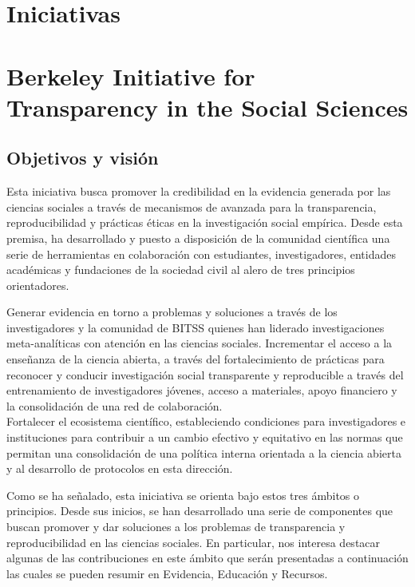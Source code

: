 \documentclass[
]{book}
\begin{document}
\hypertarget{iniciativas}{%
\section{Iniciativas}\label{iniciativas}}

\hypertarget{berkeley-initiative-for-transparency-in-the-social-sciences}{%
\section{Berkeley Initiative for Transparency in the Social Sciences}\label{berkeley-initiative-for-transparency-in-the-social-sciences}}

\hypertarget{objetivos-y-visiuxf3n}{%
\subsection{Objetivos y visión}\label{objetivos-y-visiuxf3n}}

Esta iniciativa busca promover la credibilidad en la evidencia generada por las ciencias sociales a través de mecanismos de avanzada para la transparencia, reproducibilidad y prácticas éticas en la investigación social empírica. Desde esta premisa, ha desarrollado y puesto a disposición de la comunidad científica una serie de herramientas en colaboración con estudiantes, investigadores, entidades académicas y fundaciones de la sociedad civil al alero de tres principios orientadores.

Generar evidencia en torno a problemas y soluciones a través de los investigadores y la comunidad de BITSS quienes han liderado investigaciones meta-analíticas con atención en las ciencias sociales.
Incrementar el acceso a la enseñanza de la ciencia abierta, a través del fortalecimiento de prácticas para reconocer y conducir investigación social transparente y reproducible a través del entrenamiento de investigadores jóvenes, acceso a materiales, apoyo financiero y la consolidación de una red de colaboración.\\
Fortalecer el ecosistema científico, estableciendo condiciones para investigadores e instituciones para contribuir a un cambio efectivo y equitativo en las normas que permitan una consolidación de una política interna orientada a la ciencia abierta y al desarrollo de protocolos en esta dirección.

Como se ha señalado, esta iniciativa se orienta bajo estos tres ámbitos o principios. Desde sus inicios, se han desarrollado una serie de componentes que buscan promover y dar soluciones a los problemas de transparencia y reproducibilidad en las ciencias sociales. En particular, nos interesa destacar algunas de las contribuciones en este ámbito que serán presentadas a continuación las cuales se pueden resumir en Evidencia, Educación y Recursos.
\end{document}
